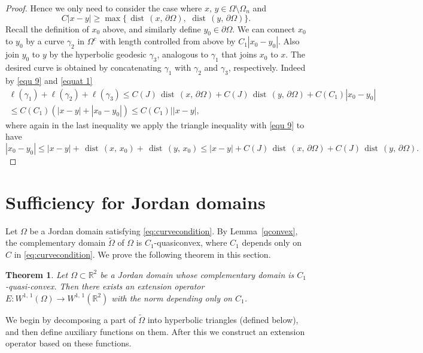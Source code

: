 \documentclass[reqno,11pt]{amsart}
\def\dist{{\mathop\mathrm{\,dist\,}}}
\def\wz{\widetilde}
\newtheorem{thm}{Theorem}[section]
\numberwithin{equation}{section}
\theoremstyle{remark}
\begin{document}
\begin{proof}
Hence we only need to consider the case where $x,\,y\in \Omega\setminus \Omega_n$ and
\begin{equation}\label{equ 9}
C|x-y|\ge \max \{\dist(x,\,\partial \Omega),\, \dist(y,\,\partial \Omega) \}. 
\end{equation}
Recall the definition of $x_0$ above, and similarly define $y_0\in \partial \Omega$. We can connect $x_0$ to $y_0$ by a curve $\gamma_2$ in $\Omega^c$ with length controlled from above by $C_1|x_0-y_0|$. Also join $y_0$ to $y$ by the hyperbolic geodesic $\gamma_3$, analogous to $\gamma_1$ that joins $x_0$ to $x$. The desired curve is obtained by concatenating $\gamma_1$ with $\gamma_2$ and $\gamma_3$, respectively. Indeed by \eqref{equ 9} and \eqref{equat 1}
\begin{align*}
\ell(\gamma_1)+\ell(\gamma_2)+\ell(\gamma_3)\le C(J) \dist(x,\,\partial \Omega)+ C(J) \dist(y,\,\partial \Omega)+C(C_1)|x_0-y_0|\\
\le C(C_1) (|x-y|+ |x_0-y_0|)\le C(C_1)| |x-y|, 
\end{align*}
where again in the last inequality we apply the  triangle inequality with \eqref{equ 9} to have
$$|x_0-y_0|\le |x-y|+\dist(x,\,x_0)+ \dist(y,\,x_0)\le |x-y|+C(J) \dist(x,\,\partial \Omega)+ C(J) \dist(y,\,\partial \Omega).$$
\end{proof}





\section{Sufficiency for Jordan domains}\label{sec:sufficiency_Jordan}

Let $\Omega$ be a Jordan domain satisfying \eqref{eq:curvecondition}. By
Lemma~\ref{qconvex}, the complementary domain
$\wz \Omega$ of $\Omega$ is $C_1$-quasiconvex, where $C_1$ depends only on $C$ in \eqref{eq:curvecondition}. We prove the following theorem in this section. 

\begin{thm}\label{Jordan suff}
Let $\Omega\subset \mathbb R^2$ be a Jordan domain whose complementary domain is $C_1$-quasi-convex. Then there exists an extension operator $E\colon W^{1,\,1}(\Omega)\to W^{1,\,1}(\mathbb R^2)$ with the norm depending only on $C_1$. 
\end{thm}

We begin by decomposing a part of $\wz \Omega$ into 
hyperbolic triangles (defined below), and then define auxiliary 
functions on them. 
After this we construct an extension operator based on these functions. 
\end{document}
